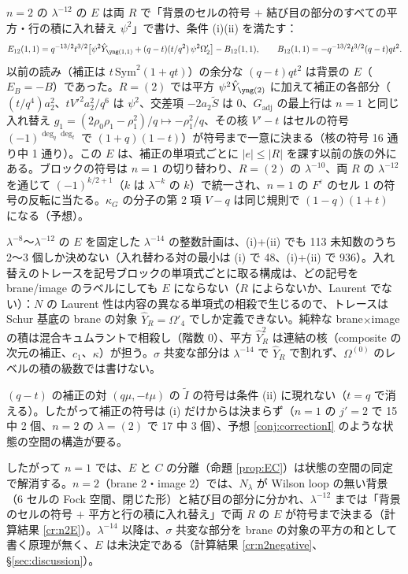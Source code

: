 \begin{compresult}[$n = 2$ の $\lambda^{-12}$ の $E$：全部入れ替え]\label{cr:n2E}
$n = 2$ の $\lambda^{-12}$ の $E$ は両 $R$ で「背景のセルの符号 $+$ 結び目の部分のすべての平方・行の積に入れ替え $\psi^2$」で書け、条件 (i)(ii) を満たす：
\[
E_{12}(1,1) = q^{-13/2}t^{3/2}\bigl[\psi^2\hat Y_{\yoneone} + (q-t)(t/q^2)\,\psi^2\Omega'_2\bigr] - B_{12}(1,1),\qquad
B_{12}(1,1) = -q^{-13/2}t^{3/2}(q-t)qt^2 .
\]
以前の読み（補正は $t\,\mathrm{Sym}^2(1+qt)$）の余分な $(q-t)qt^2$ は背景の $E$（$E_B = -B$）であった。$R = (2)$ では平方 $\psi^2\hat Y_{\ytwo}$ に加えて補正の各部分（$(t/q^4)a_2^2$、$tV'^2a_2^2/q^6$ は $\psi^2$、交差項 $-2a_2\tilde S$ は 0、$G_{\mathrm{adj}}$ の最上行は $n = 1$ と同じ入れ替え $g_1 = (2\rho_0\rho_1 - \rho_1^2)/q \mapsto -\rho_1^2/q$、その核 $V' - t$ はセルの符号 $(-1)^{\deg_q\deg_t}$ で $(1+q)(1-t)$）が符号まで一意に決まる（核の符号 16 通り中 1 通り）。この $E$ は、補正の単項式ごとに $|e|\le|R|$ を課す以前の族の外にある。ブロックの符号は $n = 1$ の切り替わり、$R = (2)$ の $\lambda^{-10}$、両 $R$ の $\lambda^{-12}$ を通じて $(-1)^{k/2+1}$（$k$ は $\lambda^{-k}$ の $k$）で統一され、$n = 1$ の $F^\varepsilon$ のセル 1 の符号の反転に当たる。$\kappa_G$ の分子の第 2 項 $V - q$ は同じ規則で $(1-q)(1+t)$ になる（予想）。
\end{compresult}
\begin{compresult}\label{cr:n2negative}
$\lambda^{-8}$〜$\lambda^{-12}$ の $E$ を固定した $\lambda^{-14}$ の整数計画は、(i)+(ii) でも 113 未知数のうち 2〜3 個しか決めない（入れ替わる対の最小は (i) で 48、(i)+(ii) で 936）。入れ替えのトレースを記号ブロックの単項式ごとに取る構成は、どの記号を brane/image のラベルにしても $E$ にならない（$R$ によらないか、Laurent でない）：$N$ の Laurent 性は内容の異なる単項式の相殺で生じるので、トレースは Schur 基底の brane の対象 $\hat Y_R = \Omega'_4$ でしか定義できない。純粋な brane$\times$image の積は混合キュムラントで相殺し（階数 0）、平方 $\hat Y_R^2$ は連結の核（composite の次元の補正、$c_1$、$\kappa$）が担う。$\sigma$ 共変な部分は $\lambda^{-14}$ で $\hat Y_R$ で割れず、$\Omega^{(0)}$ のレベルの積の級数では書けない。
\end{compresult}
\begin{proposition}\label{prop:pairblind}
$(q-t)$ の補正の対 $(q\mu, -t\mu)$ の $\tilde I$ の符号は条件 (ii) に現れない（$t = q$ で消える）。したがって補正の符号は (i) だけからは決まらず（$n = 1$ の $j' = 2$ で 15 中 2 個、$n = 2$ の $\lambda = (2)$ で 17 中 3 個）、予想 \ref{conj:correctionI} のような状態の空間の構造が要る。
\end{proposition}
したがって $n = 1$ では、$E$ と $C$ の分離（命題 \ref{prop:EC}）は状態の空間の同定で解消する。$n = 2$（brane 2・image 2）では、$N_\lambda$ が Wilson loop の無い背景（6 セルの Fock 空間、閉じた形）と結び目の部分に分かれ、$\lambda^{-12}$ までは「背景のセルの符号 $+$ 平方と行の積に入れ替え」で両 $R$ の $E$ が符号まで決まる（計算結果 \ref{cr:n2E}）。$\lambda^{-14}$ 以降は、$\sigma$ 共変な部分を brane の対象の平方の和として書く原理が無く、$E$ は未決定である（計算結果 \ref{cr:n2negative}、\S\ref{sec:discussion}）。


